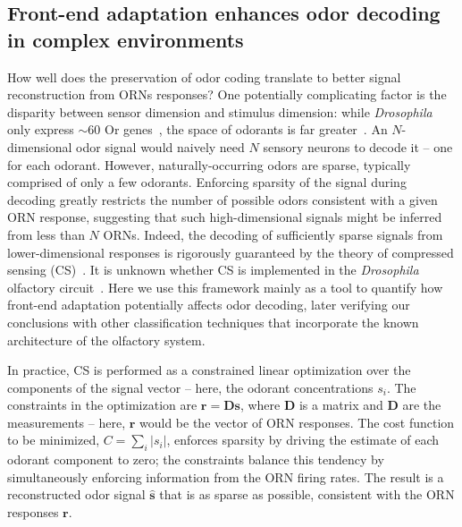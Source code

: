 \documentclass[10pt,prl,aps,showpacs,twocolumn,unsortedaddress,showkeys,linenumbers]{revtex4-1}
\begin{document}
\subsection*{Front-end adaptation enhances odor decoding in complex environments}

{\color {blue} 
How well does the preservation of odor coding  translate to better signal reconstruction from ORNs responses?
One potentially complicating factor is the disparity between sensor dimension and stimulus dimension: while \textit{Drosophila} only express $\sim 60$ Or genes~\cite{olfactory_sensory_map}, the space of odorants is far greater~\cite{vijay_1}. An $N$-dimensional odor signal would naively need $N$ sensory neurons to decode it -- one for each odorant. However, naturally-occurring odors are sparse, typically comprised of only a few odorants. Enforcing sparsity of the signal during decoding greatly restricts the number of possible odors consistent with a given ORN response, suggesting that such high-dimensional signals might be inferred from less than $N$ ORNs. Indeed, the decoding of sufficiently sparse signals from lower-dimensional responses is rigorously guaranteed by the theory of compressed sensing (CS)~\cite{CS_donoho, CS_tao}.} It is unknown whether CS is implemented in the \textit{Drosophila} olfactory circuit~\cite{chlovskii_pevlavan}. Here we use this framework mainly as a tool to quantify how front-end adaptation potentially affects odor decoding, later verifying our conclusions with other classification techniques that incorporate the known architecture of the olfactory system. 

{\color {blue} 
In practice, CS is performed as a constrained linear optimization over the components of the signal vector -- here, the odorant concentrations $s_i$. The constraints in the optimization are $\mathbf r = \mathbf D \mathbf s$, where $\mathbf D$ is a matrix and $\mathbf D$ are the measurements -- here, $\mathbf r$ would be the vector of ORN responses. The cost function to be minimized, $C = \sum_i |s_i|$, enforces sparsity by driving the estimate of each odorant component to zero; the constraints balance this tendency by simultaneously enforcing information from the ORN firing rates. The result is a reconstructed odor signal $\hat {\mathbf s}$ that is as sparse as possible, consistent with the ORN responses $\mathbf{r}$. }
\end{document}
